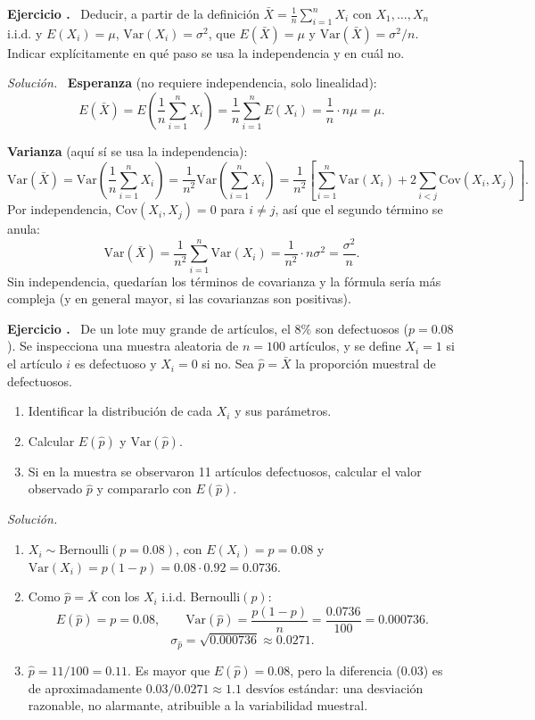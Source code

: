 \documentclass[11pt,a4paper]{article}
\newcounter{ejnum}
\newenvironment{ejercicio}{\refstepcounter{ejnum}\par\medskip\noindent\textbf{Ejercicio \theejnum.}~}{\par}
\newenvironment{solucion}{\par\noindent\textit{Solución.}~}{\par\vspace{1em}}
\begin{document}
\begin{ejercicio}
Deducir, a partir de la definición $\bar X = \frac{1}{n}\sum_{i=1}^n X_i$ con $X_1,\dots,X_n$ i.i.d. y $E(X_i)=\mu$, $\text{Var}(X_i)=\sigma^2$, que $E(\bar X)=\mu$ y $\text{Var}(\bar X)=\sigma^2/n$. Indicar explícitamente en qué paso se usa la independencia y en cuál no.
\end{ejercicio}

\begin{solucion}
\textbf{Esperanza} (no requiere independencia, solo linealidad):
$$E(\bar X) = E\left(\frac1n\sum_{i=1}^n X_i\right) = \frac1n \sum_{i=1}^n E(X_i) = \frac1n \cdot n\mu = \mu.$$

\textbf{Varianza} (aquí sí se usa la independencia):
$$\text{Var}(\bar X) = \text{Var}\left(\frac1n\sum_{i=1}^n X_i\right) = \frac{1}{n^2}\text{Var}\left(\sum_{i=1}^n X_i\right) = \frac{1}{n^2}\left[\sum_{i=1}^n \text{Var}(X_i) + 2\sum_{i<j}\text{Cov}(X_i,X_j)\right].$$
Por independencia, $\text{Cov}(X_i,X_j)=0$ para $i\ne j$, así que el segundo término se anula:
$$\text{Var}(\bar X) = \frac{1}{n^2}\sum_{i=1}^n \text{Var}(X_i) = \frac{1}{n^2}\cdot n\sigma^2 = \frac{\sigma^2}{n}.$$
Sin independencia, quedarían los términos de covarianza y la fórmula sería más compleja (y en general mayor, si las covarianzas son positivas).
\end{solucion}

\begin{ejercicio}
De un lote muy grande de artículos, el $8\%$ son defectuosos ($p=0.08$). Se inspecciona una muestra aleatoria de $n=100$ artículos, y se define $X_i=1$ si el artículo $i$ es defectuoso y $X_i=0$ si no. Sea $\hat p = \bar X$ la proporción muestral de defectuosos.
\begin{enumerate}[label=(\alph*)]
\item Identificar la distribución de cada $X_i$ y sus parámetros.
\item Calcular $E(\hat p)$ y $\text{Var}(\hat p)$.
\item Si en la muestra se observaron 11 artículos defectuosos, calcular el valor observado $\hat p$ y compararlo con $E(\hat p)$.
\end{enumerate}
\end{ejercicio}

\begin{solucion}
\begin{enumerate}[label=(\alph*)]
\item $X_i \sim \text{Bernoulli}(p=0.08)$, con $E(X_i)=p=0.08$ y $\text{Var}(X_i)=p(1-p)=0.08\cdot0.92=0.0736$.
\item Como $\hat p=\bar X$ con los $X_i$ i.i.d. Bernoulli$(p)$:
$$E(\hat p) = p = 0.08, \qquad \text{Var}(\hat p) = \frac{p(1-p)}{n} = \frac{0.0736}{100} = 0.000736.$$
$$\sigma_{\hat p} = \sqrt{0.000736} \approx 0.0271.$$
\item $\hat p = 11/100 = 0.11$. Es mayor que $E(\hat p)=0.08$, pero la diferencia ($0.03$) es de aproximadamente $0.03/0.0271\approx 1.1$ desvíos estándar: una desviación razonable, no alarmante, atribuible a la variabilidad muestral.
\end{enumerate}
\end{solucion}
\end{document}
